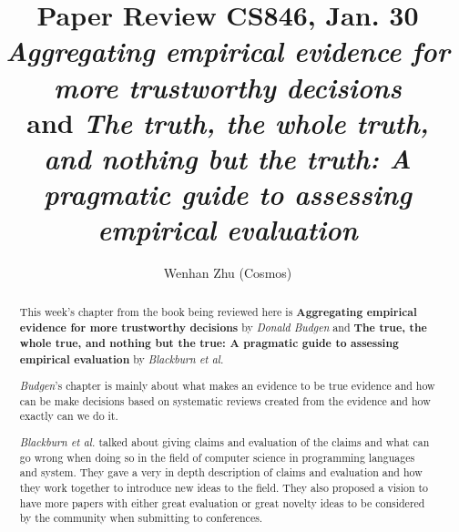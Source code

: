 \documentclass[sigconf]{acmart}
\begin{document}
%
\title{Paper Review CS846, Jan. 30\\
    {\it Aggregating empirical evidence for more trustworthy decisions} \\
    and {\it The truth, the whole truth, and nothing but the truth: A pragmatic guide to assessing empirical evaluation}
}

%
\author{Wenhan Zhu (Cosmos)}

%
\begin{abstract}
    This week's chapter from the book being reviewed here is {\bf Aggregating empirical evidence for more trustworthy decisions} by {\it Donald Budgen} and {\bf The true, the whole true, and nothing but the true: A pragmatic guide to assessing empirical evaluation} by {\it Blackburn et al.}

    {\it Budgen}'s chapter is mainly about what makes an evidence to be true evidence and how can be make decisions based on systematic reviews created from the evidence and how exactly can we do it.

    {\it Blackburn et al.} talked about giving claims and evaluation of the claims and what can go wrong when doing so in the field of computer science in programming languages and system. They gave a very in depth description of claims and evaluation and how they work together to introduce new ideas to the field. They also proposed a vision to have more papers with either great evaluation or great novelty ideas to be considered by the community when submitting to conferences. 

\end{abstract}

%

%
\end{document}
